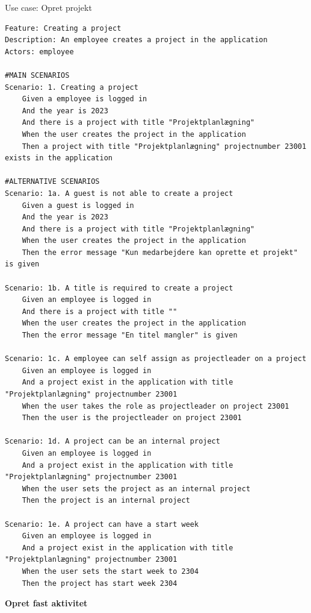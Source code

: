 \begin{listing}[H]
    \centering
    \caption{Use case: Opret projekt}\label{lst:usecase_create_project}
    \begin{verbatim}  
Feature: Creating a project
Description: An employee creates a project in the application
Actors: employee

#MAIN SCENARIOS
Scenario: 1. Creating a project
    Given a employee is logged in
    And the year is 2023
    And there is a project with title "Projektplanlægning" 
    When the user creates the project in the application 
    Then a project with title "Projektplanlægning" projectnumber 23001 exists in the application

#ALTERNATIVE SCENARIOS
Scenario: 1a. A guest is not able to create a project
    Given a guest is logged in
    And the year is 2023
    And there is a project with title "Projektplanlægning"  
    When the user creates the project in the application 
    Then the error message "Kun medarbejdere kan oprette et projekt" is given

Scenario: 1b. A title is required to create a project
    Given an employee is logged in
    And there is a project with title ""  
    When the user creates the project in the application 
    Then the error message "En titel mangler" is given

Scenario: 1c. A employee can self assign as projectleader on a project
    Given an employee is logged in
    And a project exist in the application with title "Projektplanlægning" projectnumber 23001
    When the user takes the role as projectleader on project 23001
    Then the user is the projectleader on project 23001

Scenario: 1d. A project can be an internal project
    Given an employee is logged in
    And a project exist in the application with title "Projektplanlægning" projectnumber 23001
    When the user sets the project as an internal project
    Then the project is an internal project

Scenario: 1e. A project can have a start week
    Given an employee is logged in
    And a project exist in the application with title "Projektplanlægning" projectnumber 23001
    When the user sets the start week to 2304
    Then the project has start week 2304
    \end{verbatim}
\end{listing}\newpage
\textbf{Opret fast aktivitet}
